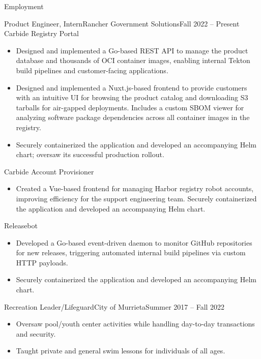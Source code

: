 \documentclass[]{resume}
\begin{document}
	\makeheader
	
	\begin{cvsection}{Employment}
		\begin{cvsubsection}{Product Engineer, Intern}{Rancher Government Solutions}{Fall 2022 -- Present}
			Carbide Registry Portal
			\begin{itemize}
				\item Designed and implemented a Go-based REST API to manage the product database and thousands of OCI container images, enabling internal Tekton build pipelines and customer-facing applications.
				\item Designed and implemented a Nuxt.js-based frontend to provide customers with an intuitive UI for browsing the product catalog and downloading S3 tarballs for air-gapped deployments. Includes a custom SBOM viewer for analyzing software package dependencies across all container images in the registry.
                \item Securely containerized the application and developed an accompanying Helm chart; oversaw its successful production rollout.
			\end{itemize}
            Carbide Account Provisioner
            \begin{itemize}
                \item Created a Vue-based frontend for managing Harbor registry robot accounts, improving efficiency for the support engineering team. Securely containerized the application and developed an accompanying Helm chart.
            \end{itemize}
			Releasebot
			\begin{itemize}
                \item Developed a Go-based event-driven daemon to monitor GitHub repositories for new releases, triggering \mbox{automated} internal build pipelines via custom HTTP payloads.
                \item Securely containerized the application and developed an accompanying Helm chart.
			\end{itemize}
		\end{cvsubsection}
		
		\begin{cvsubsection}{Recreation Leader/Lifeguard}{City of Murrieta}{Summer 2017 -- Fall 2022}	
			\begin{itemize}
				\item Oversaw pool/youth center activities while handling day-to-day transactions and security.
                \item Taught private and general swim lessons for individuals of all ages.
			\end{itemize}
		\end{cvsubsection}
	\end{cvsection}
	
\end{document}
